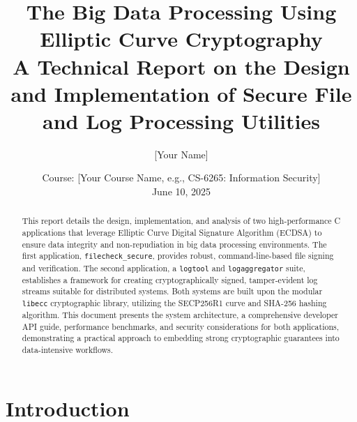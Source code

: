 \documentclass[12pt, letterpaper]{article}
\title{
	\vspace{-2cm} %
	\textbf{\huge The Big Data Processing Using Elliptic Curve Cryptography}
	\vspace{0.5cm}
	\Large \\ A Technical Report on the Design and Implementation of Secure File and Log Processing Utilities
}
\author{
	[Your Name]
}
\date{
	Course: [Your Course Name, e.g., CS-6265: Information Security] \\
	\vspace{0.5cm}
	June 10, 2025
}
\begin{document}
	
	\begin{titlepage}
		\maketitle
		\thispagestyle{empty} %
		\vfill %
		
		\begin{abstract}
			\noindent This report details the design, implementation, and analysis of two high-performance C applications that leverage Elliptic Curve Digital Signature Algorithm (ECDSA) to ensure data integrity and non-repudiation in big data processing environments. The first application, \texttt{filecheck\_secure}, provides robust, command-line-based file signing and verification. The second application, a \texttt{logtool} and \texttt{logaggregator} suite, establishes a framework for creating cryptographically signed, tamper-evident log streams suitable for distributed systems. Both systems are built upon the modular \texttt{libecc} cryptographic library, utilizing the SECP256R1 curve and SHA-256 hashing algorithm. This document presents the system architecture, a comprehensive developer API guide, performance benchmarks, and security considerations for both applications, demonstrating a practical approach to embedding strong cryptographic guarantees into data-intensive workflows.
		\end{abstract}
	\end{titlepage}
	
	\newpage
	\tableofcontents
	\newpage
	
	\section{Introduction}
	
\end{document}

